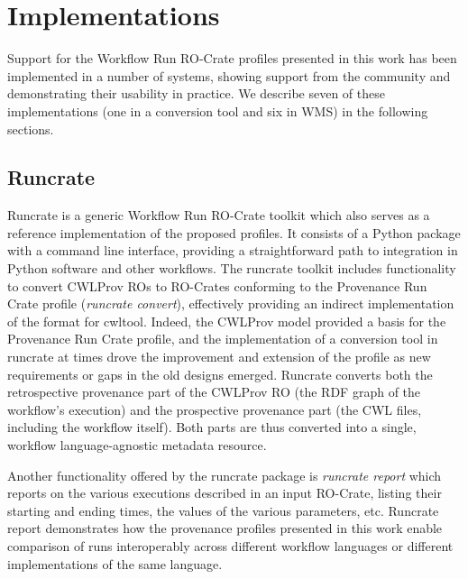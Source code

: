 \documentclass[10pt,letterpaper]{article}
\begin{document}
\section{Implementations}\label{implementations}

Support for the Workflow Run RO-Crate profiles presented in this work has been implemented in a number of systems, showing support from the community and demonstrating their usability in practice.
We describe seven of these implementations (one in a conversion tool and six in WMS) in the following sections.


\subsection{Runcrate}\label{runcrate}

Runcrate \cite{runcrate} is a generic Workflow Run RO-Crate toolkit which also serves as a reference implementation of the proposed profiles.
It consists of a Python package with a command line interface, providing a straightforward path to integration in Python software and other workflows.
The runcrate toolkit includes functionality to convert CWLProv ROs to RO-Crates conforming to the Provenance Run Crate profile (\emph{runcrate convert}), effectively providing an indirect implementation of the format for cwltool.
Indeed, the CWLProv model provided a basis for the Provenance Run Crate profile, and the implementation of a conversion tool in runcrate at times drove the improvement and extension of the profile as new requirements or gaps in the old designs emerged.
Runcrate converts both the retrospective provenance part of the CWLProv RO (the RDF graph of the workflow's execution) and the prospective provenance part (the CWL files, including the workflow itself).
Both parts are thus converted into a single, workflow language-agnostic metadata resource.

Another functionality offered by the runcrate package is \emph{runcrate report} which reports on the various executions described in an input RO-Crate, listing their starting and ending times, the values of the various parameters, etc.
Runcrate report demonstrates how the provenance profiles presented in this work enable comparison of runs interoperably across different workflow languages or different implementations of the same language.
\end{document}
